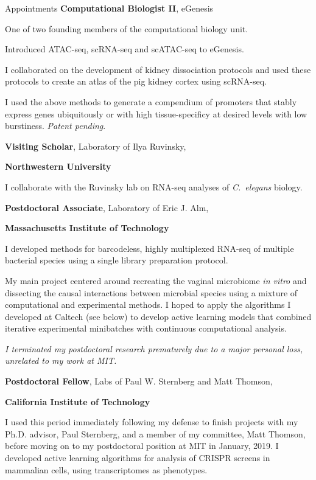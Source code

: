\begin{rubric}{Appointments}
\entry*[11/2019 -]
	\textbf{Computational Biologist II}, eGenesis\par
	One of two founding members of the computational biology unit.\par
	Introduced ATAC-seq, scRNA-seq and scATAC-seq to eGenesis.\par
	I collaborated on the development of kidney dissociation protocols and used
	these protocols to create an atlas of the pig kidney cortex using scRNA-seq.\par
	I used the above methods to generate a compendium of promoters that stably
	express genes ubiquitously or with high tissue-specificy at desired levels with
	low burstiness. \textit{Patent pending}.

\entry*[7/2020 -]
	\textbf{Visiting Scholar}, Laboratory of Ilya Ruvinsky,\par
	\textbf{Northwestern University}\par
	I collaborate with the Ruvinsky lab on RNA-seq analyses of \textit{C.~elegans}
	biology.

\entry*[01/2019--11/2019]
		\textbf{Postdoctoral Associate}, Laboratory of Eric J. Alm,\par
		\textbf{Massachusetts Institute of Technology}\par
		I developed methods for barcodeless, highly multiplexed RNA-seq of multiple
		bacterial species using a single library preparation protocol. \par
		My main project centered around recreating the vaginal microbiome \textit{in
		vitro} and dissecting the causal interactions between microbial species
		using a mixture of computational and experimental methods. I hoped to apply
		the algorithms I developed at Caltech (see below) to develop active learning
		models that combined iterative experimental minibatches with continuous
		computational analysis.\par
		\textit{I terminated my postdoctoral research prematurely due to a major
		personal loss, unrelated to my work at MIT.}

\entry*[11/2018--01/2019]
		\textbf{Postdoctoral Fellow}, Labs of Paul W. Sternberg and Matt Thomson,\par
		\textbf{California Institute of Technology}\par
		I used this period immediately following my defense to finish
		projects with my Ph.D. advisor, Paul Sternberg, and a member of my
		committee, Matt Thomson, before moving on to my postdoctoral position
		at MIT in January, 2019. I developed active learning algorithms for analysis
		of CRISPR screens in mammalian cells, using transcriptomes as phenotypes.

\end{rubric}
